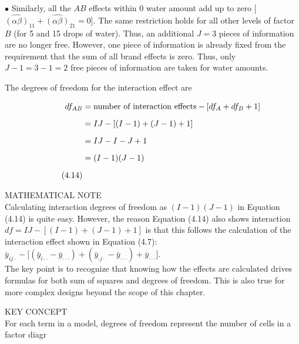 \documentclass[
]{report}
\begin{document}
\(\bullet\) Similarly, all the \(AB\) effects within 0 water amount add up to zero {[}\(\hat{(\alpha\beta)}_{11} + \hat{(\alpha\beta)}_{21} = 0\){]}. The same restriction holds for all other levels of factor \(B\) (for 5 and 15 drops of water). Thus, an additional \(J = 3\) pieces of information are no longer free. However, one piece of information is already fixed from the requirement that the sum of all brand effects is zero. Thus, only \(J - 1 = 3 - 1 = 2\) free pieces of information are taken for water amounts.

The degrees of freedom for the interaction effect are

\begin{align}
df_{AB} \notag
  &= \text{number of interaction effects} - [df_A + df_B + 1] \\[6pt] \notag
  &= IJ - [(I - 1) + (J - 1) + 1] \\[6pt] \notag
  &= IJ - I - J + 1 \\[6pt] \notag
  &= (I - 1)(J - 1) \\[6pt] \tag{4.14}
\end{align}

MATHEMATICAL NOTE\\
Calculating interaction degrees of freedom as \((I - 1)(J - 1)\) in Equation (4.14) is quite easy. However, the reason Equation (4.14) also shows interaction \(df = IJ - [(I - 1) + (J - 1) + 1]\) is that this follows the calculation of the interaction effect shown in Equation (4.7): \(\bar y_{ij\cdot} - \bigl[(\bar y_{i\cdot\cdot} - \bar y_{\cdot\cdot\cdot}) + (\bar y_{\cdot j \cdot} - \bar y_{\cdot\cdot\cdot})+ \bar y_{\cdot\cdot\cdot}\bigr].\)\\
The key point is to recognize that knowing how the effects are calculated drives formulas for both sum of squares and degrees of freedom. This is also true for more complex designs beyond the scope of this chapter.

KEY CONCEPT\\
For each term in a model, degrees of freedom represent the number of cells in a factor diagr
\end{document}
